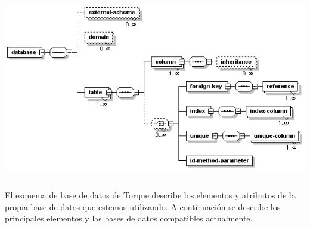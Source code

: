 \begin{center}
	\includegraphics[height=8cm]{img/xml-config.png}
\end{center}
	
	El esquema de base de datos de Torque describe los elementos y atributos de la propia base de datos que estemos utilizando. A continuación se describe los principales elementos y las bases de datos compatibles actualmente.